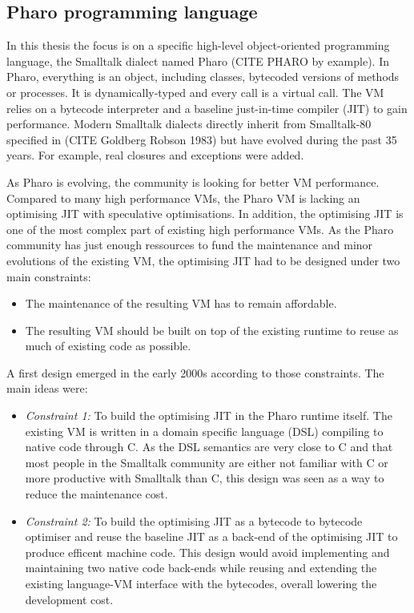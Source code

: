 \documentclass[a4paper,12pt,twoside]{../includes/ThesisStyle}
\begin{document}
\subsection{Pharo programming language}

In this thesis the focus is on a specific high-level object-oriented programming language, the Smalltalk dialect named Pharo (CITE PHARO by example). In Pharo, everything is an object, including classes, bytecoded versions of methods or processes. It is dynamically-typed and every call is a virtual call. The VM relies on a bytecode interpreter and a baseline just-in-time compiler (JIT) to gain performance. Modern Smalltalk dialects directly inherit from Smalltalk-80 specified in (CITE Goldberg  Robson 1983) but have evolved during the past 35 years. For example, real closures and exceptions were added.

As Pharo is evolving, the community is looking for better VM performance. Compared to many high performance VMs, the Pharo VM is lacking an optimising JIT with speculative optimisations. In addition, the optimising JIT is one of the most complex part of existing high performance VMs. As the Pharo community has just enough ressources to fund the maintenance and minor evolutions of the existing VM, the optimising JIT had to be designed under two main constraints:
\begin{itemize}
\item The maintenance of the resulting VM has to remain affordable.
\item The resulting VM should be built on top of the existing runtime to reuse as much of existing code as possible.
\end{itemize}

A first design emerged in the early 2000s according to those constraints. The main ideas were:
\begin{itemize}
	\item \emph{Constraint 1:} To build the optimising JIT in the Pharo runtime itself. The existing VM is written in a domain specific language (DSL) compiling to native code through C. As the DSL semantics are very close to C and that most people in the Smalltalk community are either not familiar with C or more productive with Smalltalk than C, this design was seen as a way to reduce the maintenance cost.
	\item \emph{Constraint 2:} To build the optimising JIT as a bytecode to bytecode optimiser and reuse the baseline JIT as a back-end of the optimising JIT to produce efficent machine code. This design would avoid implementing and maintaining two native code back-ends while reusing and extending the existing language-VM interface with the bytecodes, overall lowering the development cost.
\end{itemize}
\end{document}
